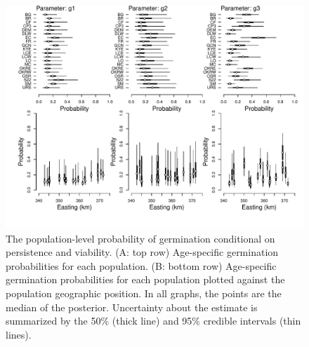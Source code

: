 \documentclass[12pt, oneside]{article}   	%
\begin{document}
 \begin{figure}[!h]
        \centering
        \includegraphics[page=1,width=.9\textwidth]{../../figures/structured-parameters-all.pdf} 
            \caption{ The population-level probability of germination conditional on persistence and viability. (A: top row) Age-specific germination probabilities for each population. (B: bottom row) Age-specific germination probabilities for each population plotted against the population geographic position. In all graphs, the points are the median of the posterior. Uncertainty about the estimate is summarized by the 50\% (thick line) and 95\% credible intervals (thin lines). }
 \label{fig:germination-estimates-population}
\end{figure}
\end{document}

